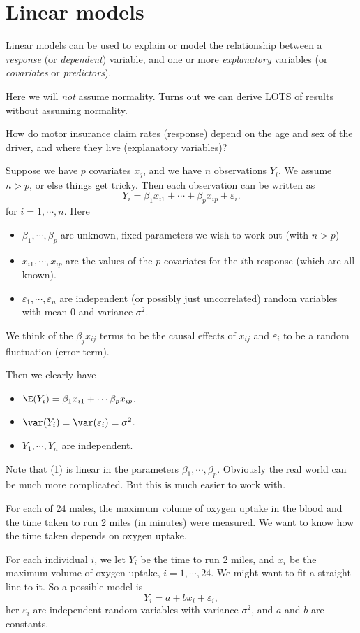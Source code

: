 \documentclass[a4paper]{article}
\begin{document}
\section{Linear models}
Linear models can be used to explain or model the relationship between a \emph{response} (or \emph{dependent}) variable, and one or more \emph{explanatory} variables (or \emph{covariates} or \emph{predictors}).

Here we will \emph{not} assume normality. Turns out we can derive LOTS of results without assuming normality.

\begin{eg}
  How do motor insurance claim rates (response) depend on the age and sex of the driver, and where they live (explanatory variables)?
\end{eg}

Suppose we have $p$ covariates $x_j$, and we have $n$ observations $Y_i$. We assume $n > p$, or else things get tricky. Then each observation can be written as
\[
  Y_i = \beta_1 x_{i1} + \cdots + \beta_p x_{ip} + \varepsilon_i.\tag{1}
\]
for $i = 1, \cdots, n$. Here
\begin{itemize}
  \item $\beta_1, \cdots, \beta_p$ are unknown, fixed parameters we wish to work out (with $n > p$)
  \item $x_{i1}, \cdots, x_{ip}$ are the values of the $p$ covariates for the $i$th response (which are all known).
  \item $\varepsilon_1, \cdots, \varepsilon_n$ are independent (or possibly just uncorrelated) random variables with mean 0 and variance $\sigma^2$.
\end{itemize}
We think of the $\beta_j x_{ij}$ terms to be the causal effects of $x_{ij}$ and $\varepsilon_i$ to be a random fluctuation (error term).

Then we clearly have
\begin{itemize}
  \item $\E(Y_i) = \beta_1 x_{i1} + \cdots \beta_px_{ip}$.
  \item $\var(Y_i) = \var(\varepsilon_i) = \sigma^2$.
  \item $Y_1, \cdots, Y_n$ are independent.
\end{itemize}
Note that (1) is linear in the parameters $\beta_1, \cdots, \beta_p$. Obviously the real world can be much more complicated. But this is much easier to work with.

\begin{eg}
  For each of 24 males, the maximum volume of oxygen uptake in the blood and the time taken to run 2 miles (in minutes) were measured. We want to know how the time taken depends on oxygen uptake.

  For each individual $i$, we let $Y_i$ be the time to run 2 miles, and $x_i$ be the maximum volume of oxygen uptake, $i = 1, \cdots, 24$. We might want to fit a straight line to it. So a possible model is
  \[
    Y_i = a + bx_i + \varepsilon_i,
  \]
  her $\varepsilon_i$ are independent random variables with variance $\sigma^2$, and $a$ and $b$ are constants.
\end{eg}
\end{document}
